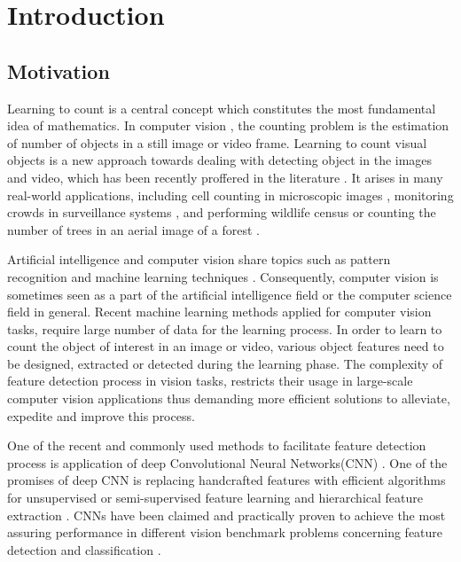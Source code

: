 \chapter{Introduction}
\label{sec:introduction}
\section{Motivation}

Learning to count is a central concept which constitutes the most fundamental idea of mathematics. In computer vision \cite{umbaugh1997computer}, the counting problem is the estimation of number of objects in a still image or video frame. Learning to count visual objects is a new approach towards dealing with detecting object in the images and video, which has been recently proffered in the literature \cite{viola2005detecting, rabaud2006counting, kong2005counting, chan2008privacy, segui2015learning}. It arises in many real-world applications, including cell counting in microscopic images \cite{flaccavento2011learning}, monitoring crowds in surveillance systems \cite{rahmalan2006crowd, valera2005intelligent}, and performing wildlife census or counting the number of trees in an aerial image of a forest \cite{brandtberg1998automated, pollock1996automatic,NIPS2010_4043}. 

Artificial intelligence and computer vision share topics such as pattern recognition and machine learning techniques \cite{michalski2013machine, mitchell1997machine}. Consequently, computer vision is sometimes seen as a part of the artificial intelligence field or the computer science field in general. Recent machine learning methods applied for computer vision tasks, require large number of data for the learning process. In order to learn to count the object of interest in an image or video, various object features need to be designed, extracted or detected during the learning phase. The complexity of feature detection process in vision tasks, restricts their usage in large-scale computer vision applications thus demanding more efficient solutions to alleviate, expedite and improve this process. 

\indent One of the recent and commonly used methods to facilitate feature detection process is application of deep Convolutional Neural Networks(CNN) \cite{szegedy2015going, krizhevsky2012imagenet, lecun1995convolutional, sermanet2013overfeat, ji20133d, taylor2010convolutional}. One of the promises of deep CNN is replacing handcrafted features with efficient algorithms for unsupervised or semi-supervised feature learning and hierarchical feature extraction \cite{song2013hierarchical}. CNNs have been claimed and practically proven to achieve the most assuring performance in different vision benchmark problems concerning feature detection and classification \cite{ciresan2011flexible, szegedy2015going, ciresan2012multi}. 

